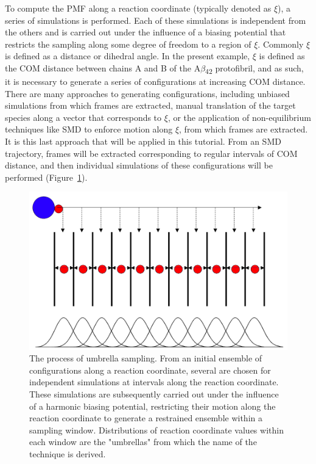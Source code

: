 \documentclass[9pt,tutorial]{livecoms}
\begin{document}
To compute the PMF along a reaction coordinate (typically denoted as $\xi$), a series of simulations is performed. Each of these simulations is independent from the others and is carried out under the influence of a biasing potential that restricts the sampling along some degree of freedom to a region of $\xi$. Commonly $\xi$ is defined as a distance or dihedral angle. In the present example, $\xi$ is defined as the COM distance between chains A and B of the A$\beta$\textsubscript{42} protofibril, and as such, it is necessary to generate a series of configurations at increasing COM distance. There are many approaches to generating configurations, including unbiased simulations from which frames are extracted, manual translation of the target species along a vector that corresponds to $\xi$, or the application of non-equilibrium techniques like SMD to enforce motion along $\xi$, from which frames are extracted. It is this last approach that will be applied in this tutorial. From an SMD trajectory, frames will be extracted corresponding to regular intervals of COM distance, and then individual simulations of these configurations will be performed (Figure~\ref{umbrella_schematic_fig}).

\begin{figure}[ht!]
\centering
\includegraphics{umbrella_schematic2}
\caption{The process of umbrella sampling. From an initial ensemble of configurations along a reaction coordinate, several are chosen for independent simulations at intervals along the reaction coordinate. These simulations are subsequently carried out under the influence of a harmonic biasing potential, restricting their motion along the reaction coordinate to generate a restrained ensemble within a sampling window. Distributions of reaction coordinate values within each window are the "umbrellas" from which the name of the technique is derived.}
\label{umbrella_schematic_fig}
\end{figure}
\end{document}
